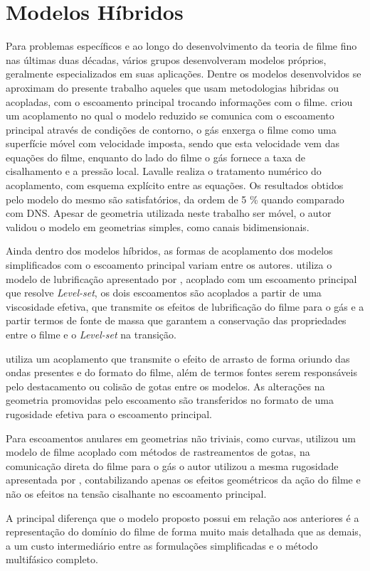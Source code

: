 \section{Modelos Híbridos}

Para problemas específicos e ao longo do desenvolvimento da teoria de filme fino nas últimas duas décadas, vários grupos desenvolveram modelos próprios, geralmente especializados em suas aplicações. Dentre os modelos desenvolvidos se aproximam do presente trabalho aqueles que usam metodologias hibridas ou acopladas, com o escoamento principal trocando informações com o filme. \citet{Lavalle2015} criou um acoplamento no qual o modelo reduzido se comunica com o escoamento principal através de condições de contorno, o gás enxerga o filme como uma superfície móvel com velocidade imposta, sendo que esta velocidade vem das equações do filme, enquanto do lado do filme o gás fornece a taxa de cisalhamento e a pressão local. Lavalle realiza o tratamento numérico do acoplamento, com esquema explícito entre as equações. Os resultados obtidos pelo modelo do mesmo são satisfatórios, da ordem de 5 \% quando comparado com DNS. Apesar de geometria utilizada neste trabalho ser móvel, o autor validou o modelo em geometrias simples, como canais bidimensionais.

Ainda dentro dos modelos híbridos, as formas de acoplamento dos modelos simplificados com o escoamento principal variam entre os autores. \citet{Qin2020} utiliza o modelo de lubrificação apresentado por \citet{Oron1997}, acoplado com um escoamento principal que resolve \textit{Level-set}, os dois escoamentos são acoplados a partir de uma viscosidade efetiva, que transmite os efeitos de lubrificação do filme para o gás e a partir termos de fonte de massa que garantem a conservação das propriedades entre o filme e o \textit{Level-set} na transição. 

\citet{Adechy2004} utiliza um acoplamento que transmite o efeito de arrasto de forma oriundo das ondas presentes e do formato do filme, além de termos fontes serem responsáveis pelo destacamento ou colisão de gotas entre os modelos. As alterações na geometria promovidas pelo escoamento são transferidos no formato de uma rugosidade efetiva para o escoamento principal.

Para escoamentos anulares em geometrias não triviais, como curvas, \citet{Zhang2024} utilizou um modelo de filme acoplado com métodos de rastreamentos de gotas, na comunicação direta do filme para o gás o autor utilizou a mesma rugosidade apresentada por \citet{Adechy2004}, contabilizando apenas os efeitos geométricos da ação do filme e não os efeitos na tensão cisalhante no escoamento principal.

A principal diferença que o modelo proposto possui em relação aos anteriores é a representação do domínio do filme de forma muito mais detalhada que as demais, a um custo intermediário entre as formulações simplificadas e o método multifásico completo. 